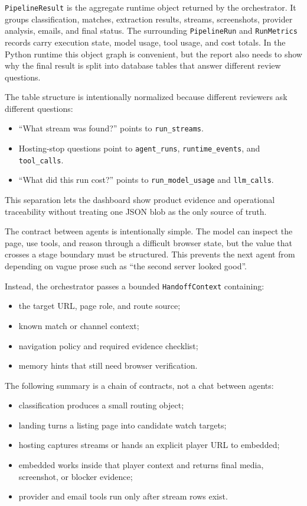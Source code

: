 \texttt{PipelineResult} is the aggregate runtime object returned by the
orchestrator. It groups classification, matches, extraction results, streams,
screenshots, provider analysis, emails, and final status. The surrounding
\texttt{PipelineRun} and \texttt{RunMetrics} records carry execution state, model
usage, tool usage, and cost totals. In the Python runtime this object graph is
convenient, but the report also needs to show why the final result is split into
database tables that answer different review questions.

The table structure is intentionally normalized because different reviewers ask
different questions:
\begin{itemize}
  \item ``What stream was found?'' points to \texttt{run\_streams}.
  \item Hosting-stop questions point to \texttt{agent\_runs},
  \texttt{runtime\_events}, and \texttt{tool\_calls}.
  \item ``What did this run cost?'' points to \texttt{run\_model\_usage} and
  \texttt{llm\_calls}.
\end{itemize}

This separation lets the dashboard show product evidence and operational traceability
without treating one JSON blob as the only source of truth.

The contract between agents is intentionally simple. The model can inspect the page,
use tools, and reason through a difficult browser state, but the value that crosses a
stage boundary must be structured. This prevents the next agent from depending on vague
prose such as ``the second server looked good''.

Instead, the orchestrator passes a bounded \texttt{HandoffContext} containing:
\begin{itemize}
  \item the target URL, page role, and route source;
  \item known match or channel context;
  \item navigation policy and required evidence checklist;
  \item memory hints that still need browser verification.
\end{itemize}

The following summary is a chain of contracts, not a chat between agents:
\begin{itemize}
  \item classification produces a small routing object;
  \item landing turns a listing page into candidate watch targets;
  \item hosting captures streams or hands an explicit player URL to embedded;
  \item embedded works inside that player context and returns final media,
  screenshot, or blocker evidence;
  \item provider and email tools run only after stream rows exist.
\end{itemize}

